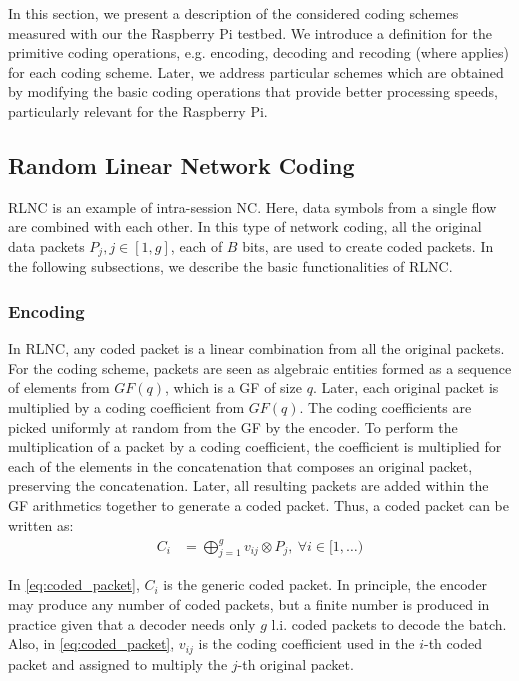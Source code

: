 \label{sec:schemes}

In this section, we present a description of the considered coding schemes
measured with our the Raspberry Pi testbed. We introduce a definition
for the primitive coding operations, e.g. encoding, decoding and recoding
(where applies) for each coding scheme. Later, we address particular schemes
which are obtained by modifying the basic coding operations that provide
better processing speeds, particularly relevant for the Raspberry Pi.

\subsection{Random Linear Network Coding}

\ac{RLNC} is an example of intra-session \ac{NC}. Here, data symbols from a
single flow are combined with each other. In this type of network coding,
all the original data packets $P_j, j \in [1,g]$, each of $B$ bits, are used
to create coded packets. In the following subsections, we describe the
basic functionalities of \ac{RLNC}.

\subsubsection{Encoding}
In \ac{RLNC}, any coded packet is a linear combination from all
the original packets. For the coding scheme, packets are seen as
algebraic entities formed as a sequence of elements from $GF(q)$,
which is a \ac{GF} of size $q$. Later, each original packet is
multiplied by a coding coefficient from $GF(q)$. The coding coefficients
are picked uniformly at random from the \ac{GF} by the encoder. To
perform the multiplication of a packet by a coding coefficient, the
coefficient is multiplied for each of the elements in the
concatenation that composes an original packet, preserving the
concatenation. Later, all resulting packets are added within the
\ac{GF} arithmetics together to generate a coded packet. Thus, a
coded packet can be written as:
%
\begin{align} \label{eq:coded_packet}
C_i  &= \bigoplus_{j=1}^{g} v_{ij} \otimes P_j ,\ \forall i \in [1,\ldots)
\end{align}

In \eqref{eq:coded_packet}, $C_i$ is the generic coded packet. In principle,
the encoder may produce any number of coded packets, but a finite
number is produced in practice given that a decoder needs only
$g$ \ac{l.i.} coded packets to decode the batch. Also, in
\eqref{eq:coded_packet}, $v_{ij}$ is the coding coefficient used in the
$i$-th coded packet and assigned to multiply the $j$-th original packet.

